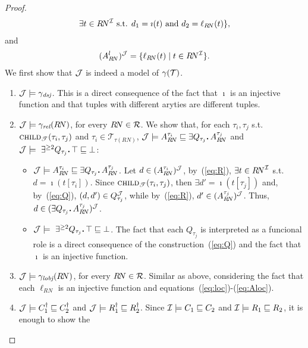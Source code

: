 \documentclass[envcountsame,draft]{llncs}
\newcommand{\Int}[1]{#1^{\Imc}\xspace}
\newcommand{\per}{\mathpunct{\mbox{\bf .}}}
\newcommand{\chd}[2]{\ensuremath{\textsc{child}_{\mathscr{T}}(#1,#2)}\xspace}
\begin{document}
\begin{proof}
\begin{multline}
    \exists t\in\Int{R\!N} \text{ s.t. } d_1=\imath(t) \text{ and } d_2=\ell_{R\!N}(t)\},
  \end{multline}
%
and
%
  \begin{align}\label{eq:Aloc}
  (A^l_{R\!N})^\Jmc = \{\ell_{R\!N}(t)\mid t\in \Int{R\!N}\}.
  \end{align}
%
We first show that $\mathcal{J}$ is indeed a model of $\gamma(\mathcal{T})$.
\begin{enumerate}
\item $\mathcal{J}\models \gamma_\textit{dsj}$. This is a direct consequence
  of the fact that $\imath$ is an injective function and that tuples
  with different aryties are different tuples.
%
\item $\mathcal{J}\models \gamma_{\textit{rel}}(R\!N)$, for every
  ${R\!N\in\mathcal{R}}$. We show that, for each $\tau_i,\tau_j$
  s.t. $\chd{\tau_i}{\tau_j}$ and $\tau_i\in\mathscr{T}_{\tau(R\!N)}$,
  $\Jmc\models A^{\tau_i}_{R\!N} \sqsubseteq \exists Q_{\tau_j}\per
  A^{\tau_j}_{R\!N}$
  and
  $\Jmc\models~\exists^{\geq 2} Q_{\tau_j}\per\top\sqsubseteq \bot$:
  \begin{itemize}
  \item
    $\Jmc\models A^{\tau_i}_{R\!N} \sqsubseteq \exists Q_{\tau_j}\per
    A^{\tau_j}_{R\!N}$.
    Let $d\in(A^{\tau_i}_{R\!N})^\mathcal{J}$, by~(\ref{eq:R}),
    $\exists t\in {R\!N}^\mathcal{I}$ s.t. $d=\imath(t[{\tau_i}])$. Since
    $\chd{\tau_i}{\tau_j}$, then $\exists d'=\imath(t[{\tau_j}])$ and,
    by~(\ref{eq:Q}), $(d,d')\in Q_{\tau_j}^\mathcal{J}$, while
    by~(\ref{eq:R}), $d'\in (A^{\tau_j}_{R\!N})^\mathcal{J}$. Thus,
    $d\in (\exists Q_{\tau_j}\per A^{\tau_j}_{R\!N})^\Jmc$.
  \item
    $\Jmc\models~\exists^{\geq 2} Q_{\tau_j}\per\top\sqsubseteq \bot$.
    The fact that each $Q_{\tau_j}$ is interpreted as a funcional role is
    a direct consequence of the construction~(\ref{eq:Q}) and the fact
    that $\imath$ is an injective function.
  \end{itemize}
%
\item $\mathcal{J}\models \gamma_{\textit{lobj}}(R\!N)$, for every
  ${R\!N\in\mathcal{R}}$. Similar as above, considering the fact that each $\ell_{R\!N}$ is
  an injective function and equations~(\ref{eq:loc})-(\ref{eq:Aloc}).
%
\item $\mathcal{J}\models {C_1^\dag\sqsubseteq C_2^\dag}$ and
  $\mathcal{J}\models {R_1^\dag\sqsubseteq R_2^\dag}$. Since
  $\mathcal{I}\models {C_1\sqsubseteq C_2}$ and
  $\mathcal{I}\models R_1\sqsubseteq R_2$, it is enough to show the

\end{enumerate}
\end{proof}
\end{document}
